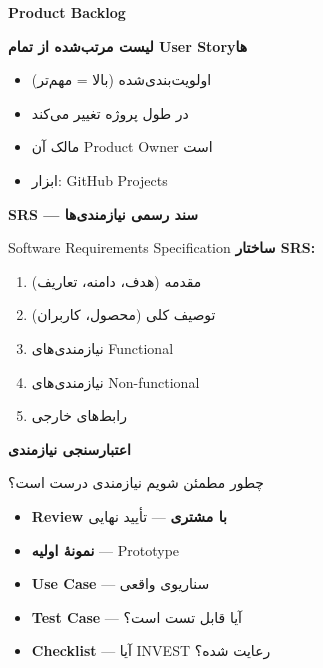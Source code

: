 \documentclass[14pt, a4paper, landscape]{extarticle}
\newcommand{\slide}[1]{%
    \newpage
    \begin{center}
    \begin{minipage}[t]{0.95\textwidth}
    \vspace{0.5cm}
    #1
    \vspace{0.5cm}
    \end{minipage}
    \end{center}
}
\newcommand{\slidetitle}[1]{%
    \begin{center}
        {\LARGE\bfseries\textcolor{primary}{#1}}
    \end{center}
    \vspace{0.5cm}
}
\begin{document}
\slide{
    \slidetitle{Product Backlog}
    \vspace{0.5cm}
    \begin{center}
        {\large\bfseries لیست مرتب‌شده از تمام User Storyها}
    \end{center}
    
    \vspace{0.5cm}
    
    \begin{itemize}[itemsep=0.5em]
        \item اولویت‌بندی‌شده (بالا = مهم‌تر)
        \item در طول پروژه تغییر می‌کند
        \item مالک آن Product Owner است
        \item ابزار: GitHub Projects
    \end{itemize}
}

\slide{
    \slidetitle{SRS — سند رسمی نیازمندی‌ها}
    \vspace{0.5cm}
    {\large Software Requirements Specification}
    \vspace{0.8cm}
    {\bfseries\textcolor{primary}{ساختار SRS:}}
    \vspace{0.3cm}
    \begin{enumerate}[itemsep=0.3em]
        \item مقدمه (هدف، دامنه، تعاریف)
        \item توصیف کلی (محصول، کاربران)
        \item نیازمندی‌های Functional
        \item نیازمندی‌های Non-functional
        \item رابط‌های خارجی
    \end{enumerate}
}

\slide{
    \slidetitle{اعتبارسنجی نیازمندی}
    \vspace{0.5cm}
    {\large چطور مطمئن شویم نیازمندی درست است؟}
    \vspace{0.8cm}
    \begin{itemize}[itemsep=0.6em]
        \item {\large\textbf{Review با مشتری} — تأیید نهایی}
        \item {\large\textbf{نمونهٔ اولیه} — Prototype}
        \item {\large\textbf{Use Case} — سناریوی واقعی}
        \item {\large\textbf{Test Case} — آیا قابل تست است؟}
        \item {\large\textbf{Checklist} — آیا INVEST رعایت شده؟}
    \end{itemize}
}
\end{document}
